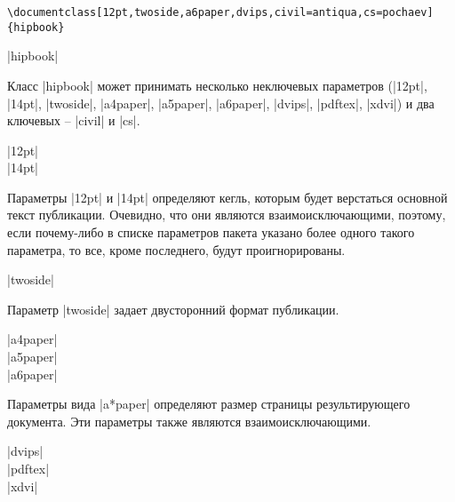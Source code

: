 \documentclass{ltxguide}
\begin{document}
\begin{verbatim}
\documentclass[12pt,twoside,a6paper,dvips,civil=antiqua,cs=pochaev]{hipbook}
\end{verbatim}

\begin{decl}
  |hipbook|
\end{decl}

Класс |hipbook| может принимать несколько неключевых параметров
(|12pt|, |14pt|, |twoside|, |a4paper|, |a5paper|, |a6paper|, |dvips|, |pdftex|, |xdvi|) и два
ключевых -- |civil| и |cs|.

\begin{decl}
  |12pt|\\
  |14pt|
\end{decl}

Параметры |12pt| и |14pt| определяют кегль, которым будет верстаться основной
текст публикации. Очевидно, что они являются взаимоисключающими, поэтому, если
почему-либо в списке параметров пакета указано более одного такого параметра,
то все, кроме последнего, будут проигнорированы.

\begin{decl}
  |twoside|
\end{decl}

Параметр |twoside| задает двусторонний формат публикации.

\begin{decl}
  |a4paper|\\
  |a5paper|\\
  |a6paper|
\end{decl}

Параметры вида |a*paper| определяют размер страницы результирующего документа.
Эти параметры также являются взаимоисключающими.

\begin{decl}
  |dvips|\\
  |pdftex|\\
  |xdvi|
\end{decl}
\end{document}
